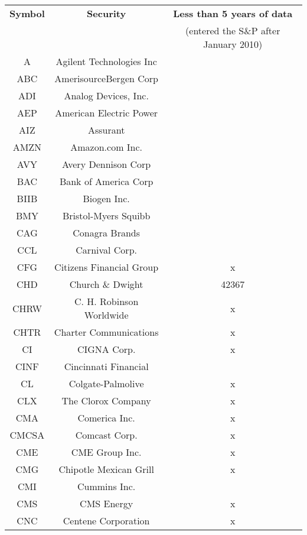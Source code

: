 \documentclass[11pt]{article}
\begin{document}
\begin{onehalfspace}
\begin{longtable}[h!]{|c|c|c|}
    \hline
    \textbf{Symbol} & \textbf{Security} & \textbf{Less than 5 years of data} \\
     &  &  (entered the S\&P after January 2010) \\ 
    \hline \hline
        A & Agilent Technologies Inc &  \\ \hline
        ABC & AmerisourceBergen Corp &  \\ \hline
        ADI & Analog Devices, Inc. &  \\ \hline
        AEP & American Electric Power &  \\ \hline
        AIZ & Assurant &  \\ \hline
        AMZN & Amazon.com Inc. &  \\ \hline
        AVY & Avery Dennison Corp &  \\ \hline
        BAC & Bank of America Corp &  \\ \hline
        BIIB & Biogen Inc. &  \\ \hline
        BMY & Bristol-Myers Squibb &  \\ \hline
        CAG & Conagra Brands &  \\ \hline
        CCL & Carnival Corp. &  \\ \hline
        CFG & Citizens Financial Group & x \\ \hline
        CHD & Church \& Dwight & 42367 \\ \hline
        CHRW & C. H. Robinson Worldwide & x \\ \hline
        CHTR & Charter Communications & x \\ \hline
        CI & CIGNA Corp. & x \\ \hline
        CINF & Cincinnati Financial &  \\ \hline
        CL & Colgate-Palmolive & x \\ \hline
        CLX & The Clorox Company & x \\ \hline
        CMA & Comerica Inc. & x \\ \hline
        CMCSA & Comcast Corp. & x \\ \hline
        CME & CME Group Inc. & x \\ \hline
        CMG & Chipotle Mexican Grill & x \\ \hline
        CMI & Cummins Inc. &  \\ \hline
        CMS & CMS Energy & x \\ \hline
        CNC & Centene Corporation & x \\ \hline

\end{longtable}
\end{onehalfspace}
\end{document}
